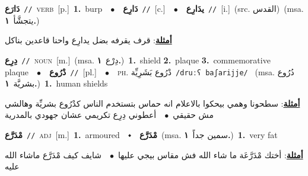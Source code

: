 \documentclass[10pt,a4paper,twoside]{article} %
\begin{document}
\begin{multicols}{2}
{\setlength\topsep{0pt}\textbf{\foreignlanguage{arabic}{دَارَع}}\ {\color{gray}\texttt{//}\color{black}}\ \textsc{verb}\ [p.]\ \textbf{1.}~burp\ \ $\bullet$\ \ \setlength\topsep{0pt}\textbf{\foreignlanguage{arabic}{دَارِع}}\ {\color{gray}\texttt{//}\color{black}}\ [c.]\ \ $\bullet$\ \ \setlength\topsep{0pt}\textbf{\foreignlanguage{arabic}{يدَارِع}}\ {\color{gray}\texttt{//}\color{black}}\ [i.]\ (src. \color{gray}\foreignlanguage{arabic}{القدس}\color{black})\ \color{gray}(msa. \foreignlanguage{arabic}{يتجشَّأ}~\foreignlanguage{arabic}{\textbf{١.}})\color{black}\  \begin{flushright}\color{gray}\foreignlanguage{arabic}{\textbf{\underline{\foreignlanguage{arabic}{أمثلة}}}: قرف يقرفه بضل يدارِع واحنا قاعدين بناكل}\end{flushright}\color{black}} \vspace{2mm}

{\setlength\topsep{0pt}\textbf{\foreignlanguage{arabic}{دِرِع}}\ {\color{gray}\texttt{//}\color{black}}\ \textsc{noun}\ [m.]\ \color{gray}(msa. \foreignlanguage{arabic}{دِرْع}~\foreignlanguage{arabic}{\textbf{١.}})\color{black}\ \textbf{1.}~shield  \textbf{2.}~plaque  \textbf{3.}~commemorative plaque\ \ $\bullet$\ \ \setlength\topsep{0pt}\textbf{\foreignlanguage{arabic}{دْرُوع}}\ {\color{gray}\texttt{//}\color{black}}\ [pl.]\ \ $\bullet$\ \ \textsc{ph.} \color{gray} \foreignlanguage{arabic}{دْرُوع بَشَرِيِّة}\color{black}\ {\color{gray}\texttt{/{\sffamily druːʕ baʃarijje}/}\color{black}}\ \color{gray} (msa. \foreignlanguage{arabic}{دُرُوع بشريَّة}~\foreignlanguage{arabic}{\textbf{١.}})\color{black}\ \textbf{1.}~human shields\  \begin{flushright}\color{gray}\foreignlanguage{arabic}{\textbf{\underline{\foreignlanguage{arabic}{أمثلة}}}: سطحونا وهمي بيحكوا بالاعلام انه حماس بتستخدم الناس كدْرُوع بشريِّة وهالشي مش حقيقي\ $\bullet$\ \  أعطوني دِرِع تكريمي عشان جهودي بالمدرية}\end{flushright}\color{black}} \vspace{2mm}

{\setlength\topsep{0pt}\textbf{\foreignlanguage{arabic}{مْدَرَّع}}\ {\color{gray}\texttt{//}\color{black}}\ \textsc{adj}\ [m.]\ \textbf{1.}~armoured\ \ $\smblkdiamond$\ \ \setlength\topsep{0pt}\textbf{\foreignlanguage{arabic}{مْدَرَّع}}\ \color{gray}(msa. \foreignlanguage{arabic}{سمين جداً}~\foreignlanguage{arabic}{\textbf{١.}})\color{black}\ \textbf{1.}~very fat\  \begin{flushright}\color{gray}\foreignlanguage{arabic}{\textbf{\underline{\foreignlanguage{arabic}{أمثلة}}}: أختك مْدَرَّعَة ما شاء الله فش مقاس بيجي عليها\ $\bullet$\ \  شايف كيف مْدَرَّع ماشاء الله عليه}\end{flushright}\color{black}} \vspace{2mm}


\end{multicols}
\end{document}
